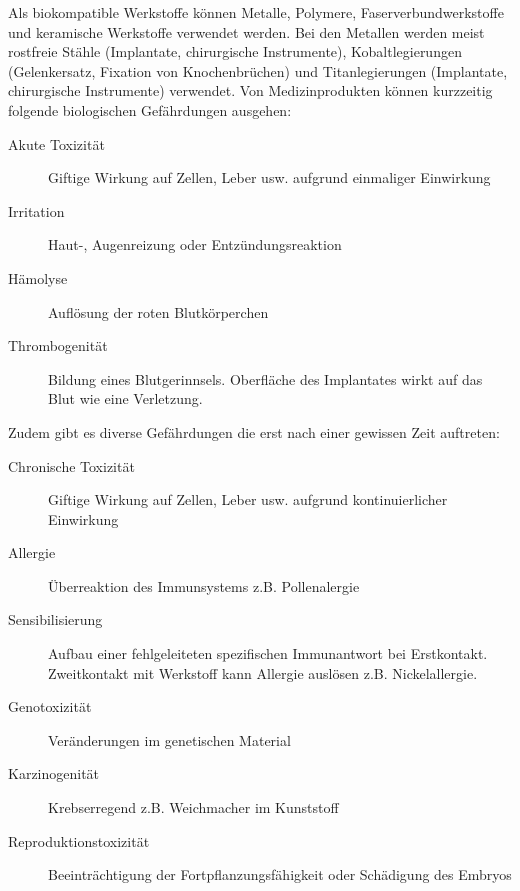 Als biokompatible Werkstoffe können Metalle, Polymere, Faserverbundwerkstoffe und keramische Werkstoffe verwendet werden. Bei den Metallen werden meist rostfreie Stähle (Implantate, chirurgische Instrumente), Kobaltlegierungen (Gelenkersatz, Fixation von Knochenbrüchen) und Titanlegierungen (Implantate, chirurgische Instrumente) verwendet. Von Medizinprodukten können kurzzeitig folgende biologischen Gefährdungen ausgehen:
\begin{description}
	\item[Akute Toxizität] Giftige Wirkung auf Zellen, Leber usw. aufgrund einmaliger Einwirkung
	\item[Irritation] Haut-, Augenreizung oder Entzündungsreaktion
	\item[Hämolyse] Auflösung der roten Blutkörperchen
	\item[Thrombogenität] Bildung eines Blutgerinnsels. Oberfläche des Implantates wirkt auf das Blut wie eine Verletzung.
\end{description}
Zudem gibt es diverse Gefährdungen die erst nach einer gewissen Zeit auftreten:
\begin{description}
	\item[Chronische Toxizität] Giftige Wirkung auf Zellen, Leber usw. aufgrund kontinuierlicher Einwirkung
	\item[Allergie] Überreaktion des Immunsystems z.B. Pollenalergie
	\item[Sensibilisierung] Aufbau einer fehlgeleiteten spezifischen Immunantwort bei Erstkontakt. Zweitkontakt mit Werkstoff kann Allergie auslösen z.B. Nickelallergie.
	\item[Genotoxizität] Veränderungen im genetischen Material
	\item[Karzinogenität] Krebserregend z.B. Weichmacher im Kunststoff
	\item[Reproduktionstoxizität] Beeinträchtigung der Fortpflanzungsfähigkeit oder Schädigung des Embryos
\end{description}